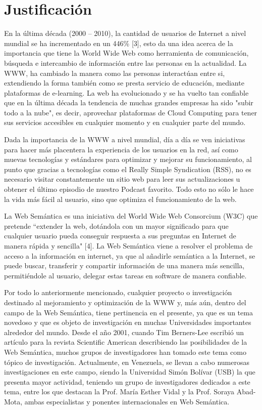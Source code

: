 \newpage


\section{Justificación }

En la última década (2000 – 2010), la cantidad de usuarios de Internet a nivel mundial se ha incrementado en un 446\% [3], esto da una idea acerca de la importancia que tiene la World Wide Web como herramienta de comunicación, búsqueda e intercambio de información entre las personas en la actualidad. La WWW, ha cambiado la manera como las personas interactúan entre si, extendiendo la forma también como se presta servicio de educación, mediante plataformas de e-learning. La web ha evolucionado y se ha vuelto tan confiable que en la última década la tendencia de muchas grandes empresas ha sido "subir todo a la nube", es decir, aprovechar plataformas de Cloud Computing para tener sus servicios accesibles en cualquier momento y en cualquier parte del mundo.

Dada la importancia de la WWW a nivel mundial, día a día se ven iniciativas para hacer más placentera la experiencia de los usuarios en la red, así como muevas tecnologías y estándares para optimizar y mejorar su funcionamiento, al punto que gracias a tecnologías como el Really Simple Syndication (RSS), no es necesario visitar constantemente un sitio web para leer sus actualizaciones u obtener el último episodio de nuestro Podcast favorito. Todo esto no sólo le hace la vida más fácil al usuario, sino que optimiza el funcionamiento de la web.

La Web Semántica es una iniciativa del World Wide Web Consorcium (W3C) que pretende ``extender la web, dotándola con un mayor significado para que cualquier usuario pueda conseguir respuesta a sus preguntas en Internet de manera rápida y sencilla" [4]. La Web Semántica viene a resolver el problema de acceso a la información en internet, ya que al añadirle semántica a la Internet, se puede buscar, transferir y compartir información de una manera más sencilla, permitiéndole al usuario, delegar estas tareas en software de manera confiable.

Por todo lo anteriormente mencionado, cualquier proyecto o investigación destinado al mejoramiento y optimización de la WWW y, más aún, dentro del campo de la Web Semántica, tiene pertinencia en el presente, ya que es un tema novedoso y que es objeto de investigación en muchas Universidades importantes alrededor del mundo. Desde el año 2001, cuando Tim Berners-Lee escribió un artículo para la revista Scientific American describiendo las posibilidades de la Web Semántica, muchos grupos de investigadores han tomado este tema como tópico de investigación. Actualmente, en Venezuela, se llevan a cabo numerosas investigaciones en este campo, siendo la Universidad Simón Bolívar (USB) la que presenta mayor actividad, teniendo un grupo de investigadores dedicados a este tema, entre los que destacan la Prof. María Esther Vidal y la Prof. Soraya Abad-Mota, ambas especialistas y ponentes internacionales en Web Semántica.

